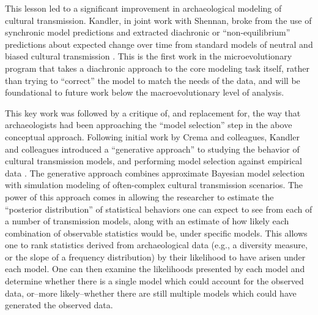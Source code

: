 This lesson led to a significant improvement in archaeological modeling of cultural transmission.  Kandler, in joint work with Shennan, broke from the use of synchronic model predictions and extracted diachronic or ``non-equilibrium'' predictions about expected change over time from standard models of neutral and biased cultural transmission \citep{Kandler2013}.  This is the first work in the microevolutionary program that takes a diachronic approach to the core modeling task itself, rather than trying to ``correct'' the model to match the needs of the data, and will be foundational to future work below the macroevolutionary level of analysis.  

This key work was followed by a critique of, and replacement for, the way that archaeologists had been approaching the ``model selection'' step in the above conceptual approach.  Following initial work by Crema \citeyearpar{Crema2014} and colleagues, Kandler and colleagues introduced a ``generative approach'' to studying the behavior of cultural transmission models, and performing model selection against empirical data \citep{Kandler20150905,wilderkandler2015,kandler2018generative,kandler2019analysing}.  The generative approach combines approximate Bayesian model selection \citep{sisson2018handbook} with simulation modeling of often-complex cultural transmission scenarios.   The power of this approach comes in allowing the researcher to estimate the ``posterior distribution'' of statistical behaviors one can expect to see from each of a number of transmission models, along with an estimate of how likely each combination of observable statistics would be, under specific models.  This allows one to rank statistics derived from archaeological data (e.g., a diversity measure, or the slope of a frequency distribution) by their likelihood to have arisen under each model.  One can then examine the likelihoods presented by each model and determine whether there is a single model which could account for the observed data, or--more likely--whether there are still multiple models which could have generated the observed data.  


